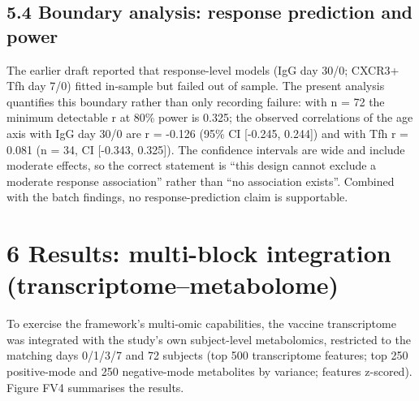 \documentclass[
]{article}
\begin{document}
\subsection{5.4 Boundary analysis: response prediction and
power}\label{boundary-analysis-response-prediction-and-power}

The earlier draft reported that response-level models (IgG day 30/0;
CXCR3+ Tfh day 7/0) fitted in-sample but failed out of sample. The
present analysis quantifies this boundary rather than only recording
failure: with n = 72 the minimum detectable \textbar r\textbar{} at 80\%
power is 0.325; the observed correlations of the age axis with IgG day
30/0 are r = -0.126 (95\% CI {[}-0.245, 0.244{]}) and with Tfh r = 0.081
(n = 34, CI {[}-0.343, 0.325{]}). The confidence intervals are wide and
include moderate effects, so the correct statement is ``this design
cannot exclude a moderate response association'' rather than ``no
association exists''. Combined with the batch findings, no
response-prediction claim is supportable.

\section{6 Results: multi-block integration
(transcriptome--metabolome)}\label{results-multi-block-integration-transcriptomemetabolome}

To exercise the framework's multi-omic capabilities, the vaccine
transcriptome was integrated with the study's own subject-level
metabolomics, restricted to the matching days 0/1/3/7 and 72 subjects
(top 500 transcriptome features; top 250 positive-mode and 250
negative-mode metabolites by variance; features z-scored). Figure FV4
summarises the results.
\end{document}
